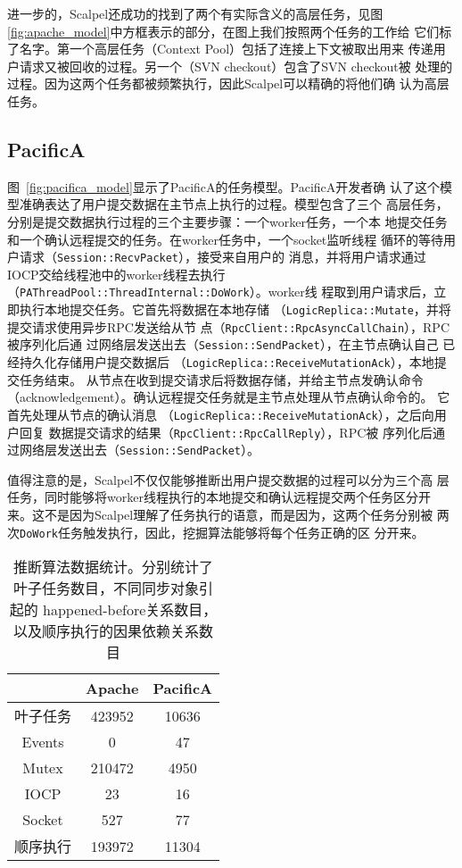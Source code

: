 进一步的，Scalpel还成功的找到了两个有实际含义的高层任务，见图~
\ref{fig:apache_model}中方框表示的部分，在图上我们按照两个任务的工作给
它们标了名字。第一个高层任务（Context Pool）包括了连接上下文被取出用来
传递用户请求又被回收的过程。另一个（SVN checkout）包含了SVN checkout被
处理的过程。因为这两个任务都被频繁执行，因此Scalpel可以精确的将他们确
认为高层任务。

\subsection{PacificA}


图~\ref{fig:pacifica_model}显示了PacificA的任务模型。PacificA开发者确
认了这个模型准确表达了用户提交数据在主节点上执行的过程。模型包含了三个
高层任务，分别是提交数据执行过程的三个主要步骤：一个worker任务，一个本
地提交任务和一个确认远程提交的任务。在worker任务中，一个socket监听线程
循环的等待用户请求（\texttt{Session\-::Recv\-Packet}），接受来自用户的
消息，并将用户请求通过IOCP交给线程池中的worker线程去执行
（\texttt{PA\-Thread\-Pool\-::Thread\-Internal\-::DoWork}）。worker线
程取到用户请求后，立即执行本地提交任务。它首先将数据在本地存储
（\texttt{Logic\-Replica\-::Mutate}，并将提交请求使用异步RPC发送给从节
点（\texttt{Rpc\-Client\-::Rpc\-Async\-Call\-Chain}），RPC被序列化后通
过网络层发送出去（\texttt{Session\-::Send\-Packet}），在主节点确认自己
已经持久化存储用户提交数据后
（\texttt{Logic\-Replica\-::Receive\-MutationAck}），本地提交任务结束。
从节点在收到提交请求后将数据存储，并给主节点发确认命令
（acknowledgement）。确认远程提交任务就是主节点处理从节点确认命令的。
它首先处理从节点的确认消息
（\texttt{Logic\-Replica\-::Receive\-Mutation\-Ack}），之后向用户回复
数据提交请求的结果（\texttt{Rpc\-Client\-::Rpc\-Call\-Reply}），RPC被
序列化后通过网络层发送出去（\texttt{Session\-::Send\-Packet}）。

值得注意的是，Scalpel不仅仅能够推断出用户提交数据的过程可以分为三个高
层任务，同时能够将worker线程执行的本地提交和确认远程提交两个任务区分开
来。这不是因为Scalpel理解了任务执行的语意，而是因为，这两个任务分别被
两次\texttt{DoWork}任务触发执行，因此，挖掘算法能够将每个任务正确的区
分开来。

\begin{table}[t!]
\small
\centering
\begin{minipage}{0.8\linewidth}
\centering
\caption{推断算法数据统计。分别统计了叶子任务数目，不同同步对象引起的
happened-before关系数目，以及顺序执行的因果依赖关系数目}
\label{fig:statistics}
\begin{tabular}{ccc}

\toprule[1.5pt]
  		& Apache	& PacificA \\
\midrule[1pt]
叶子任务	& 423952	& 10636 \\
Events		& 0			& 47 \\
Mutex 		& 210472	& 4950 \\
IOCP		& 23		& 16 \\
Socket		& 527		& 77 \\
顺序执行	& 193972	& 11304 \\
\bottomrule[1.5pt]
\end{tabular}
\end{minipage}
\end{table}

